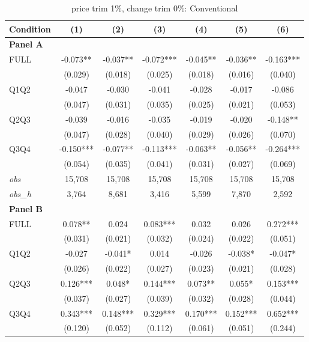 \documentclass[10pt]{article}
\begin{document}
\begin{table}[!htbp]
\centering
\caption{price trim 1\%, change trim 0\%: Conventional}
\label{tab:abc:trim10:conventional}
\small
\begin{tabular}{lcccccc}
\toprule
Condition & (1) & (2) & (3) & (4) & (5) & (6) \\
\midrule
\textbf{Panel A} &&&&&&  \\

FULL & -0.073** & -0.037** & -0.072*** & -0.045** & -0.036** & -0.163*** \\
 & (0.029) & (0.018) & (0.025) & (0.018) & (0.016) & (0.040) \\
Q1Q2 & -0.047 & -0.030 & -0.041 & -0.028 & -0.017 & -0.086 \\
 & (0.047) & (0.031) & (0.035) & (0.025) & (0.021) & (0.053) \\
Q2Q3 & -0.039 & -0.016 & -0.035 & -0.019 & -0.020 & -0.148** \\
 & (0.047) & (0.028) & (0.040) & (0.029) & (0.026) & (0.070) \\
Q3Q4 & -0.150*** & -0.077** & -0.113*** & -0.063** & -0.056** & -0.264*** \\
 & (0.054) & (0.035) & (0.041) & (0.031) & (0.027) & (0.069) \\

\textit{obs} & 15,708 & 15,708 & 15,708 & 15,708 & 15,708 & 15,708 \\
\textit{obs\_h} & 3,764 & 8,681 & 3,416 & 5,599 & 7,870 & 2,592 \\

\textbf{Panel B} &&&&&&  \\

FULL & 0.078** & 0.024 & 0.083*** & 0.032 & 0.026 & 0.272*** \\
 & (0.031) & (0.021) & (0.032) & (0.024) & (0.022) & (0.051) \\
Q1Q2 & -0.027 & -0.041* & 0.014 & -0.026 & -0.038* & -0.047* \\
 & (0.026) & (0.022) & (0.027) & (0.023) & (0.021) & (0.028) \\
Q2Q3 & 0.126*** & 0.048* & 0.144*** & 0.073** & 0.055* & 0.153*** \\
 & (0.037) & (0.027) & (0.039) & (0.032) & (0.028) & (0.044) \\
Q3Q4 & 0.343*** & 0.148*** & 0.329*** & 0.170*** & 0.152*** & 0.652*** \\
 & (0.120) & (0.052) & (0.112) & (0.061) & (0.051) & (0.244) \\


\end{tabular}
\end{table}
\end{document}
